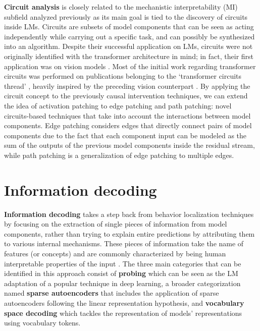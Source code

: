 \textbf{Circuit analysis} is closely related to the mechanistic interpretability (MI) subfield analyzed previously as its main goal is tied to the discovery of circuits inside LMs.
Circuits are subsets of model components that can be seen as acting independently while carrying out a specific task, and can possibly be synthesized into an algorithm.
Despite their successful application on LMs, circuits were not originally identified with the transformer architecture in mind; in fact, their first application was on vision models \cite{cammarata2020}.
Most of the initial work regarding transformer circuits was performed on publications belonging to the `transformer circuits thread' \cite{elhage2021,olsson2022,elhage2022,bricken2023}, heavily inspired by the preceding vision counterpart \cite{cammarata2020}.
By applying the circuit concept to the previously causal intervention techniques, we can extend the idea of activation patching to edge patching and path patching: novel circuits-based techniques that take into account the interactions between model components.
Edge patching \cite{li2023} considers edges that directly connect pairs of model components due to the fact that each component input can be modeled as the sum of the outputs of the previous model components inside the residual stream, while path patching \cite{wang2023} is a generalization of edge patching to multiple edges.


\section{Information decoding}

\textbf{Information decoding} takes a step back from behavior localization techniques by focusing on the extraction of single pieces of information from model components, rather than trying to explain entire predictions by attributing them to various internal mechanisms.
These pieces of information take the name of features (or concepts) and are commonly characterized by being human interpretable properties of the input \cite{kim2018}.
The three main categories that can be identified in this approach consist of \textbf{probing} which can be seen as the LM adaptation of a popular technique in deep learning, a broader categorization named \textbf{sparse autoencoders} that includes the application of sparse autoencoders following the linear representation hypothesis, and \textbf{vocabulary space decoding} which tackles the representation of models' representations using vocabulary tokens.

